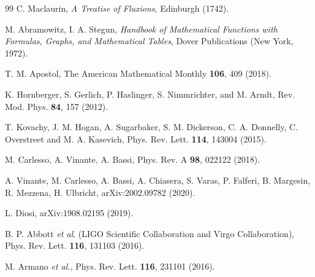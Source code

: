 \documentclass[11pt,onecolumn,amssymb,nofootinbib]{revtex4}
\begin{document}
\begin{thebibliography}{99}
 C. Maclaurin, {\it A Treatise of Fluxions}, Edinburgh (1742).

 M. Abramowitz, I. A. Stegun,  {\it Handbook of Mathematical Functions with Formulas, Graphs, and Mathematical Tables}, Dover Publications (New York, 1972).

 T. M. Apostol, The American Mathematical Monthly {\bf106}, 409 (2018).

 K. Hornberger, S. Gerlich, P. Haslinger, S. Nimmrichter, and M. Arndt,
Rev. Mod. Phys. {\bf84}, 157 (2012).

 T. Kovachy, J. M. Hogan, A. Sugarbaker, S. M. Dickerson, C. A. Donnelly, C. Overstreet and M. A. Kasevich, Phys. Rev. Lett. {\bf114}, 143004 (2015).

 M. Carlesso, A. Vinante, A. Bassi, Phys. Rev. A {\bf98}, 022122 (2018).

 A. Vinante, M. Carlesso, A. Bassi, A. Chiasera, S. Varas, P. Falferi, B. Margesin, R. Mezzena, H. Ulbricht, arXiv:2002.09782 (2020).

 L. Diosi, arXiv:1908.02195 (2019).

 B. P. Abbott {\it et al}. (LIGO Scientific Collaboration and
Virgo Collaboration), Phys. Rev. Lett. {\bf116}, 131103 (2016).

 M. Armano {\it et al.}, Phys. Rev. Lett. {\bf 116}, 231101 (2016).

\end{thebibliography}
\end{document}
